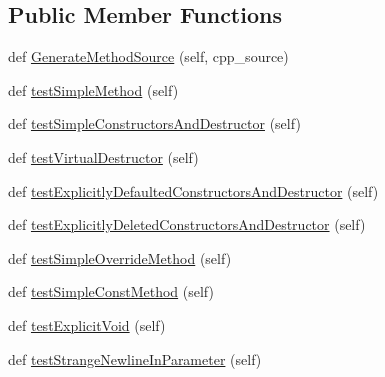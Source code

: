 \subsection*{Public Member Functions}
\begin{DoxyCompactItemize}
\item 
def \mbox{\hyperlink{classscripts_1_1generator_1_1cpp_1_1gmock__class__test_1_1_generate_methods_test_a0841ea565f3309c5126955fb540d5e61}{Generate\+Method\+Source}} (self, cpp\+\_\+source)
\item 
def \mbox{\hyperlink{classscripts_1_1generator_1_1cpp_1_1gmock__class__test_1_1_generate_methods_test_a805f6ff2a8db6c750b86f140b83feb5e}{test\+Simple\+Method}} (self)
\item 
def \mbox{\hyperlink{classscripts_1_1generator_1_1cpp_1_1gmock__class__test_1_1_generate_methods_test_a59ab9fff3c8fb1611f65279b72a02d6b}{test\+Simple\+Constructors\+And\+Destructor}} (self)
\item 
def \mbox{\hyperlink{classscripts_1_1generator_1_1cpp_1_1gmock__class__test_1_1_generate_methods_test_a1ae1dc25054146a175b9317a7500c74a}{test\+Virtual\+Destructor}} (self)
\item 
def \mbox{\hyperlink{classscripts_1_1generator_1_1cpp_1_1gmock__class__test_1_1_generate_methods_test_ad4b0b2b990cbce80aed4a9cc9be4b4cc}{test\+Explicitly\+Defaulted\+Constructors\+And\+Destructor}} (self)
\item 
def \mbox{\hyperlink{classscripts_1_1generator_1_1cpp_1_1gmock__class__test_1_1_generate_methods_test_ad6e907a1d6712fc083c8fc62f2ffae85}{test\+Explicitly\+Deleted\+Constructors\+And\+Destructor}} (self)
\item 
def \mbox{\hyperlink{classscripts_1_1generator_1_1cpp_1_1gmock__class__test_1_1_generate_methods_test_a1336492c60d37666f41f64d93660d1ca}{test\+Simple\+Override\+Method}} (self)
\item 
def \mbox{\hyperlink{classscripts_1_1generator_1_1cpp_1_1gmock__class__test_1_1_generate_methods_test_a4467c906846f7fd1c30e379333247069}{test\+Simple\+Const\+Method}} (self)
\item 
def \mbox{\hyperlink{classscripts_1_1generator_1_1cpp_1_1gmock__class__test_1_1_generate_methods_test_a497e8ef13ae773d2d9acecc39411114f}{test\+Explicit\+Void}} (self)
\item 
def \mbox{\hyperlink{classscripts_1_1generator_1_1cpp_1_1gmock__class__test_1_1_generate_methods_test_acca63bd8327c93b4e715ae2f6800460c}{test\+Strange\+Newline\+In\+Parameter}} (self)
\item 

\end{DoxyCompactItemize}
